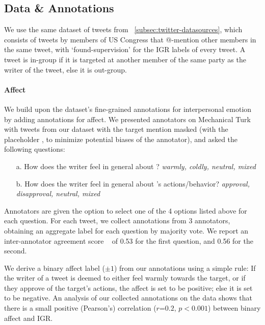 \subsection{Data \& Annotations}
\label{subsec:data}

We use the same dataset of tweets from \textsection~\ref{subsec:twitter-datasources}, which consists of tweets by members of US Congress that @-mention other members in the same tweet, with `found-supervision' for the IGR labels of every tweet. A tweet is in-group if it is targeted at another member of the same party as the writer of the tweet, else it is out-group.

\paragraph{Affect}
We build upon the dataset's fine-grained annotations for interpersonal emotion by adding annotations for affect. We presented annotators on Mechanical Turk with tweets from our dataset with the target mention masked (with the placeholder \@Doe, to minimize potential biases of the annotator), and asked the following questions:

\begin{enumerate}
    \item[a.] How does the writer feel in general about \@Doe? \emph{warmly, coldly, neutral, mixed}
    \item[b.] How does the writer feel in general about \@Doe's actions/behavior? \emph{approval, disapproval, neutral, mixed}
\end{enumerate}

Annotators are given the option to select one of the 4 options listed above for each question. For each tweet, we collect annotations from 3 annotators, obtaining an aggregate label for each question by majority vote. We report an inter-annotator agreement score ~\citep[Fleiss's kappa;][]{fleiss1971measuring} of 0.53 for the first question, and 0.56 for the second.

We derive a binary affect label ($\pm 1$) from our annotations using a simple rule: If the writer of a tweet is deemed to either feel warmly towards the target, or if they approve of the target's actions, the affect is set to be positive; else it is set to be negative. An analysis of our collected annotations on the data shows that there is a small positive (Pearson's) correlation ($r$=$0.2$, $p<0.001$) between binary affect and IGR.


